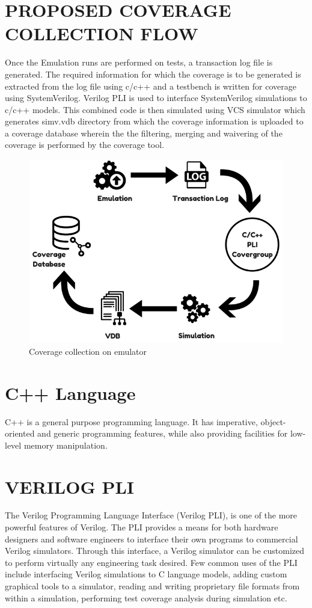 \section{PROPOSED COVERAGE COLLECTION FLOW}
Once the Emulation runs are performed on tests, a transaction log file is generated. The required information for which the coverage is to be generated is extracted from the log file using c/c++ and a testbench is written for coverage using SystemVerilog. Verilog PLI is used to interface SystemVerilog simulations to c/c++ models. This combined code is then simulated using VCS simulator which generates simv.vdb directory from which the coverage information is uploaded to a coverage database wherein the the filtering, merging and waivering of the coverage is performed by the coverage tool.
\vspace{15pt}
\begin{figure}[h!]
\centering
\includegraphics[scale=0.8]{./figures/coverage_collection_on_emulator.png}
\caption{Coverage collection on emulator}
\label{fig:coverage_collection_on_emulator.png}
\end{figure}

\section{C++ Language}
C++ is a general purpose programming language. It has imperative, object-oriented and generic programming features, while also providing facilities for low-level memory manipulation.
\section{VERILOG PLI}
The Verilog Programming Language Interface (Verilog PLI), is one of the more powerful features of Verilog. The PLI provides a means for both hardware designers and software engineers to interface their own programs to commercial Verilog simulators. Through this interface, a Verilog simulator can be customized to perform virtually any engineering task desired. Few common uses of the PLI include interfacing Verilog simulations to C language models, adding custom graphical tools to a simulator, reading and writing proprietary file formats from within a simulation, performing test coverage analysis during simulation etc.
